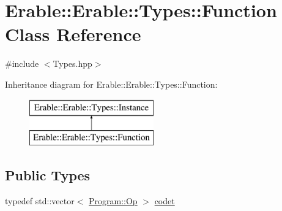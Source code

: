 \hypertarget{class_erable_1_1_erable_1_1_types_1_1_function}{}\section{Erable\+::Erable\+::Types\+::Function Class Reference}
\label{class_erable_1_1_erable_1_1_types_1_1_function}


{\ttfamily \#include $<$Types.\+hpp$>$}

Inheritance diagram for Erable\+::Erable\+::Types\+::Function\+:\begin{figure}[H]
\begin{center}
\leavevmode
\includegraphics[height=2.000000cm]{class_erable_1_1_erable_1_1_types_1_1_function}
\end{center}
\end{figure}
\subsection*{Public Types}
\begin{DoxyCompactItemize}
\item 
typedef std\+::vector$<$ \mbox{\hyperlink{struct_erable_1_1_erable_1_1_program_1_1_op}{Program\+::\+Op}} $>$ \mbox{\hyperlink{class_erable_1_1_erable_1_1_types_1_1_function_a5ae77103155252fd2e6934e506644858}{codet}}
\end{DoxyCompactItemize}
